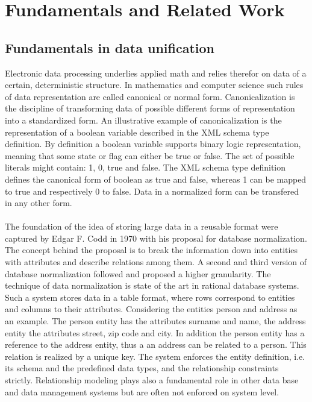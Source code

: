 \chapter{Fundamentals and Related Work\label{cha:chapter2}}

\section{Fundamentals in data unification\label{sec:unification}}

Electronic data processing underlies applied math and relies therefor on data of a certain, deterministic structure. In mathematics and computer science such rules of data representation are called canonical or normal form. Canonicalization is the discipline of transforming data of possible different forms of representation into a standardized form. An illustrative example of canonicalization is the representation of a boolean variable described in the XML schema type definition. By definition a boolean variable supports binary logic representation, meaning that some state or flag can either be true or false. The set of possible literals might contain: 1, 0, true and false. The XML schema type definition defines the canonical form of boolean as true and false, whereas 1 can be mapped to true and respectively 0 to false. Data in a normalized form can be transfered in any other form.
\\\\
The foundation of the idea of storing large data in a reusable format were captured by Edgar F. Codd in 1970 with his proposal for database normalization. The concept behind the proposal is to break the information down into entities with attributes and describe relations among them. A second and third version of database normalization followed and proposed a higher granularity. The technique of data normalization is state of the art in rational database systems. Such a system stores data in a table format, where rows correspond to entities and columns to their attributes. Considering the entities person and address as an example. The person entity has the attributes surname and name, the address entity the attributes street, zip code and city. In addition the person entity has a reference to the address entity, thus a an address can be related to a person. This relation is realized by a unique key. The system enforces the entity definition, i.e. its schema and the predefined data types, and the relationship constraints strictly. Relationship modeling plays also a fundamental role in other data base and data management systems but are often not enforced on system level.
